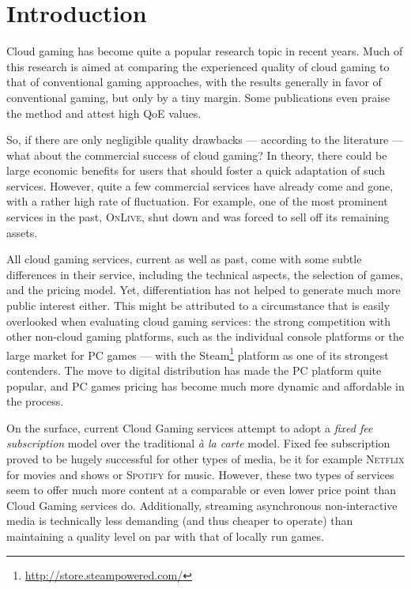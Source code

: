 

\section{Introduction}

Cloud gaming has become quite a popular research topic in recent years. 
Much of this research is aimed at comparing the experienced 
quality of cloud gaming to that of conventional gaming approaches, with 
the results
generally in favor of conventional gaming, but only by a 
tiny margin. Some publications even praise the method and attest high 
\gls{QoE} values.

So, if there are only negligible quality drawbacks --- according to the 
literature --- what about the commercial success of cloud gaming? In 
theory, there could be large economic benefits for users that should 
foster a quick adaptation of such services. 
However, quite a few commercial services have already come and gone, 
with a rather high rate of fluctuation. For example, one of the most 
prominent services in the past, \textsc{OnLive}, shut down and was forced to 
sell off its remaining assets.

All cloud gaming services, current as well 
as past, come with some subtle differences in their service, including 
the technical aspects, the selection of games, and the pricing 
model.
Yet, differentiation has not helped to generate much more public 
interest either. 
This might be attributed to a circumstance that is easily  
overlooked when evaluating cloud gaming services: the strong 
competition with other non-cloud gaming platforms, such as the 
individual console platforms or the large market for PC games --- with the 
Steam\footnote{\url{http://store.steampowered.com/}} platform as one of 
its strongest contenders. The move to digital distribution has made the 
PC platform quite popular, and PC games pricing has become 
much more dynamic and affordable in the process.

On the surface, current Cloud Gaming services attempt to adopt a 
\textit{fixed fee subscription} model over the traditional 
\textit{à la carte} model. 
Fixed fee subscription proved to be hugely successful for other 
types of media, be 
it for example \textsc{Netflix} for movies and shows or 
\textsc{Spotify} for music. However, these two types of services seem 
to offer much more content at a comparable or even lower price point 
than Cloud Gaming services do. Additionally, streaming asynchronous 
non-interactive media is technically less demanding 
(and thus cheaper to operate) than 
maintaining a quality level on par with that of locally run games.

